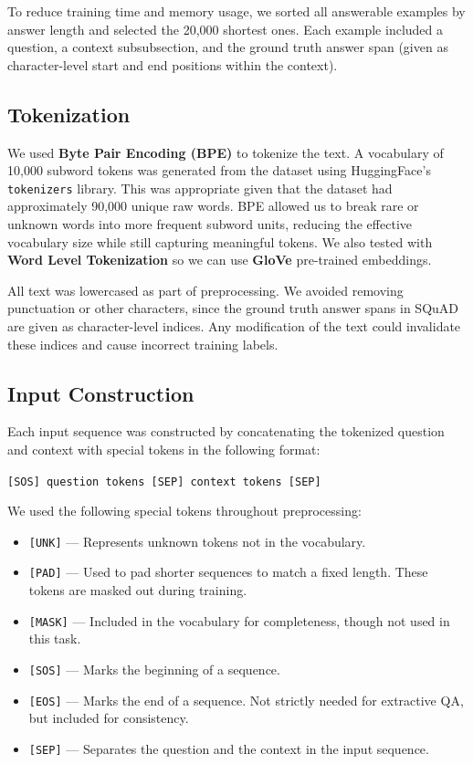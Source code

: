 \documentclass[runningheads]{llncs}
\begin{document}
To reduce training time and memory usage, we sorted all answerable examples by answer length and selected the 20,000 shortest ones. Each example included a question, a context subsubsection, and the ground truth answer span (given as character-level start and end positions within the context).

\subsection{Tokenization}

We used \textbf{Byte Pair Encoding (BPE)} to tokenize the text. A vocabulary of 10,000 subword tokens was generated from the dataset using HuggingFace's \texttt{tokenizers} library. This was appropriate given that the dataset had approximately 90,000 unique raw words. BPE allowed us to break rare or unknown words into more frequent subword units, reducing the effective vocabulary size while still capturing meaningful tokens. We also tested with \textbf{Word Level Tokenization} so we can use \textbf{GloVe} pre-trained embeddings.
\\
\par

All text was lowercased as part of preprocessing. We avoided removing punctuation or other characters, since the ground truth answer spans in SQuAD are given as character-level indices. Any modification of the text could invalidate these indices and cause incorrect training labels.

\subsection{Input Construction}

Each input sequence was constructed by concatenating the tokenized question and context with special tokens in the following format:

\texttt{[SOS] question tokens [SEP] context tokens [SEP]}

We used the following special tokens throughout preprocessing:
\begin{itemize}
    \item \texttt{[UNK]} --- Represents unknown tokens not in the vocabulary.
    \item \texttt{[PAD]} --- Used to pad shorter sequences to match a fixed length. These tokens are masked out during training.
    \item \texttt{[MASK]} --- Included in the vocabulary for completeness, though not used in this task.
    \item \texttt{[SOS]} --- Marks the beginning of a sequence.
    \item \texttt{[EOS]} --- Marks the end of a sequence. Not strictly needed for extractive QA, but included for consistency.
    \item \texttt{[SEP]} --- Separates the question and the context in the input sequence.
\end{itemize}
\end{document}
